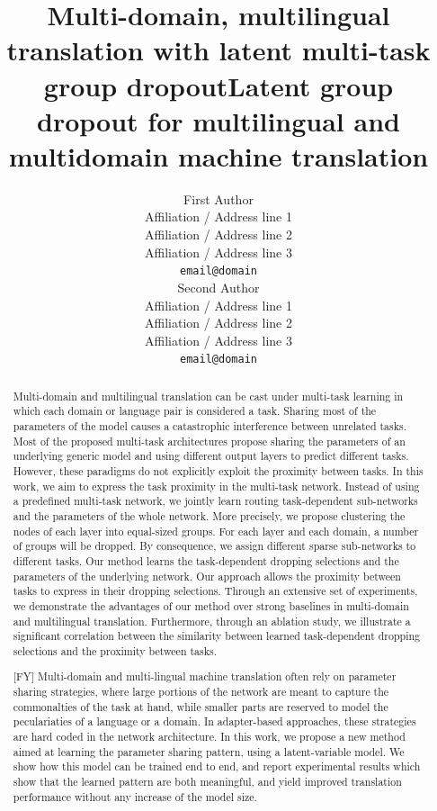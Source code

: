\documentclass[11pt]{article}
\title{Multi-domain, multilingual translation with latent multi-task group dropout}
\title{Latent group dropout for multilingual and multidomain machine translation}
\author{First Author \\
  Affiliation / Address line 1 \\
  Affiliation / Address line 2 \\
  Affiliation / Address line 3 \\
  \texttt{email@domain} \\\And
  Second Author \\
  Affiliation / Address line 1 \\
  Affiliation / Address line 2 \\
  Affiliation / Address line 3 \\
  \texttt{email@domain} \\}
\begin{document}
\setlength{\abovedisplayskip}{3pt}
\setlength{\belowdisplayskip}{3pt}
\maketitle
\begin{abstract}
Multi-domain and multilingual translation can be cast under multi-task learning in which each domain or language pair is considered a task. Sharing most of the parameters of the model causes a catastrophic interference between unrelated tasks. Most of the proposed multi-task architectures propose sharing the parameters of an underlying generic model and using different output layers to predict different tasks. However, these paradigms do not explicitly exploit the proximity between tasks. In this work, we aim to express the task proximity in the multi-task network. Instead of using a predefined multi-task network, we jointly learn routing task-dependent sub-networks and the parameters of the whole network. More precisely, we propose clustering the nodes of each layer into equal-sized groups. For each layer and each domain, a number of groups will be dropped. By consequence, we assign different sparse sub-networks to different tasks. Our method learns the task-dependent dropping selections and the parameters of the underlying network. Our approach allows the proximity between tasks to express in their dropping selections. Through an extensive set of experiments, we demonstrate the advantages of our method over strong baselines in multi-domain and multilingual translation. Furthermore, through an ablation study, we illustrate a significant correlation between the similarity between learned task-dependent dropping selections and the proximity between tasks.
\end{abstract}

\begin{abstract}
  [FY] Multi-domain and multi-lingual machine translation often rely on parameter sharing strategies, where large portions of the network are meant to capture the commonalties of the task at hand, while smaller parts are reserved to model the peculariaties of a language or a domain. In adapter-based approaches, these strategies are hard coded in the network architecture. In this work, we propose a new method aimed at learning the parameter sharing pattern, using a latent-variable model. We show how this model can be trained end to end, and report experimental results which show that the learned pattern are both meaningful, and yield improved translation performance without any increase of the model size. 
\end{abstract}
\end{document}
